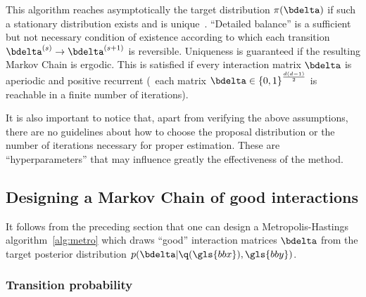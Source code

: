 This algorithm reaches asymptotically the target distribution $\pi(\bdelta)$ if such a stationary distribution exists and is unique~\cite{meyn2012markov}. ``Detailed balance'' is a sufficient but not necessary condition of existence according to which each transition $\bdelta^{(s)} \rightarrow \bdelta^{(s+1)}$ is reversible. Uniqueness is guaranteed if the resulting Markov Chain is ergodic. This is satisfied if every interaction matrix $\bdelta$ is aperiodic and positive recurrent (\ each matrix $\bdelta \in {\{0,1\}}^{\frac{d(d-1)}{2}}$ is reachable in a finite number of iterations). 

It is also important to notice that, apart from verifying the above assumptions, there are no guidelines about how to choose the proposal distribution or the number of iterations necessary for proper estimation. These are ``hyperparameters'' that may influence greatly the effectiveness of the method.

\subsection{Designing a Markov Chain of good interactions} \label{subsec:mcmc}

It follows from the preceding section that one can design a Metropolis-Hastings algorithm~\eqref{alg:metro} which draws ``good'' interaction matrices $\bdelta$ from the target posterior distribution $p(\bdelta | \q(\gls{bbx}),\gls{bby})$.

\subsubsection{Transition probability}

